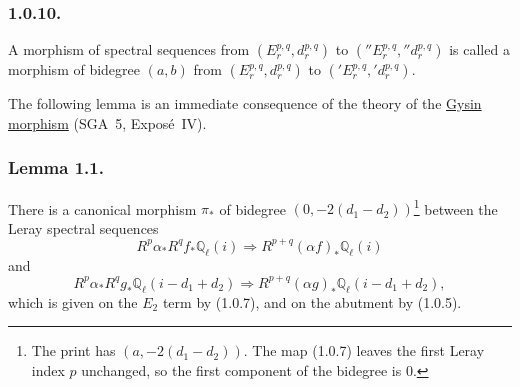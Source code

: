 \subsubsection*{1.0.10.}
A morphism of spectral sequences from
$(E_r^{p,q},d_r^{p,q})$ to $({}''E_r^{p,q},{}''d_r^{p,q})$ is called a
morphism of bidegree $(a,b)$ from $(E_r^{p,q},d_r^{p,q})$ to
$({}'E_r^{p,q},{}'d_r^{p,q})$.

The following lemma is an immediate consequence of the theory of the
\underline{Gysin morphism} (SGA~5, Expos\'e~IV).

\subsubsection*{Lemma 1.1.}
There is a canonical morphism $\pi_*$ of bidegree
$(0,-2(d_1-d_2))$\footnote{The print has $(a,-2(d_1-d_2))$.  The map
(1.0.7) leaves the first Leray index $p$ unchanged, so the first component
of the bidegree is $0$.} between the Leray spectral sequences
\begin{equation}\tag{1.1.0}
R^p\alpha_*R^qf_*\mathbb Q_\ell(i)\Longrightarrow
R^{p+q}(\alpha f)_*\mathbb Q_\ell(i)
\end{equation}
and
\begin{equation}\tag{1.1.1}
R^p\alpha_*R^qg_*\mathbb Q_\ell(i-d_1+d_2)\Longrightarrow
R^{p+q}(\alpha g)_*\mathbb Q_\ell(i-d_1+d_2),
\end{equation}
which is given on the $E_2$ term by (1.0.7), and on the abutment by
(1.0.5).

